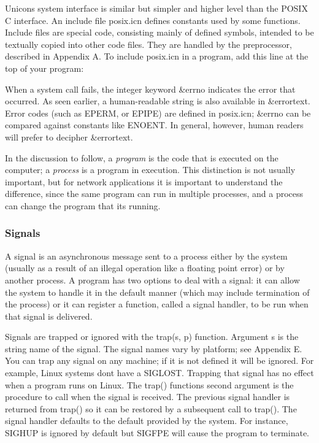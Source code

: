 Unicon{\textquotesingle}s system interface is similar but simpler and
higher level than the POSIX C interface. An include file
\textsf{posix.icn} defines constants used by some functions. Include
files are special code, consisting mainly of defined symbols, intended
to be textually copied into other code files. They are handled by the
preprocessor, described in Appendix A. To include \textsf{posix.icn} in
a program, add this line at the top of your program:


When a system call fails, the integer keyword
\textsf{\&errno} indicates the error that occurred. As seen earlier, a
human-readable string is also available in \textsf{\&errortext}. Error codes (such as \textsf{EPERM}, or
\textsf{EPIPE}) are defined in \textsf{posix.icn}; \textsf{\&errno} can be compared against constants like
\textsf{ENOENT}. In general, however, human readers will prefer to
decipher \textsf{\&errortext}.

In the discussion to follow, a \textit{program} is the code that is
executed on the computer; a \textit{process}\textit{ }is
a program in execution. This distinction is not usually important, but
for network applications it is important to understand the difference,
since the same program can run in multiple processes, and a process can
change the program that it{\textquotesingle}s running.

\subsubsection{Signals}

A signal is an asynchronous message sent to a process
either by the system (usually as a result of an illegal operation like
a floating point error) or by another
process. A program has two options to deal with a signal: it can allow
the system to handle it in the default manner (which may include
termination of the process) or it can register a function, called a
signal handler, to be run when that signal is delivered.

Signals are trapped or ignored with the \textsf{trap(s, p)} function.
Argument \textsf{s} is the string name of the signal. The signal names
vary by platform; see Appendix E. You can trap any signal on any
machine; if it is not defined it will be ignored. For example, Linux
systems don{\textquotesingle}t have a \textsf{SIGLOST.} Trapping that
signal has no effect when a program runs on Linux. The \textsf{trap()}
function{\textquotesingle}s second argument is the procedure to call
when the signal is received. The previous signal handler is returned
from \textsf{trap()} so it can be restored by a
subsequent call to \textsf{trap()}. The signal handler defaults to the
default provided by the system. For instance, \textsf{SIGHUP} is
ignored by default but \textsf{SIGFPE} will cause the program to
terminate.

